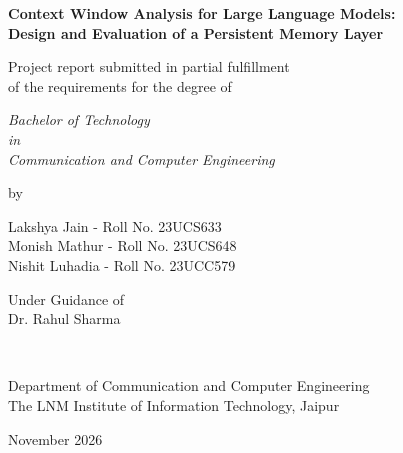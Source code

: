\thispagestyle{empty}
\begin{center}
{\Large \bf Context Window Analysis for Large Language Models:\\[4pt] Design and Evaluation of a Persistent Memory Layer}


\vspace*{1.5cm}
{\large Project report submitted in partial fulfillment\\}
{\large  of the requirements for the degree of \\}

\vspace*{1cm}
{\it {\large Bachelor of Technology} \\
{\large in\\}
{\large Communication and Computer Engineering \\}}

\vspace*{1cm}
{\large by}

\vspace*{1cm}
{\large Lakshya Jain - Roll No. 23UCS633\\}
{\large Monish Mathur - Roll No. 23UCS648\\}
{\large Nishit Luhadia - Roll No. 23UCC579\\}


\vspace*{5mm}
{\large Under Guidance of \\}
{\large Dr. Rahul Sharma \\}

\vspace*{1.0cm}
{\\}

\vspace*{1.5cm}
{\large Department of Communication and Computer Engineering \\}
{\large The LNM Institute of Information Technology, Jaipur\\}

\vspace*{1.0cm}
{\large November 2026\\}
\end{center}

\clearpage
